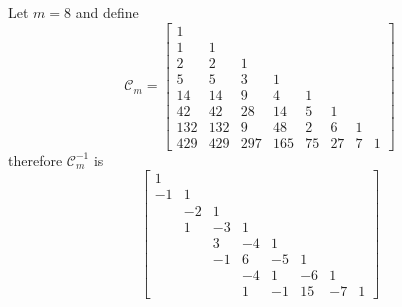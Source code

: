 Let $m=8$ and define
\begin{displaymath}
\mathcal{C}_{m}=\left[\begin{matrix}1 &   &   &   &   &   &   &  \\1 & 1 &   &   &   &   &   &  \\2 & 2 & 1 &   &   &   &   &  \\5 & 5 & 3 & 1 &   &   &   &  \\14 & 14 & 9 & 4 & 1 &   &   &  \\42 & 42 & 28 & 14 & 5 & 1 &   &  \\132 & 132 & 9  & 48 & 2  & 6 & 1 &  \\429 & 429 & 297 & 165 & 75 & 27 & 7 & 1\end{matrix}\right]
\end{displaymath}
therefore $\mathcal{C}_{m}^{-1}$ is
\begin{displaymath}
\left[\begin{matrix}1 &   &   &   &   &   &   &  \\-1 & 1 &   &   &   &   &   &  \\  & -2 & 1 &   &   &   &   &  \\  & 1 & -3 & 1 &   &   &   &  \\  &   & 3 & -4 & 1 &   &   &  \\  &   & -1 & 6 & -5 & 1 &   &  \\  &   &   & -4 & 1  & -6 & 1 &  \\  &   &   & 1 & -1  & 15 & -7 & 1\end{matrix}\right]
\end{displaymath}
